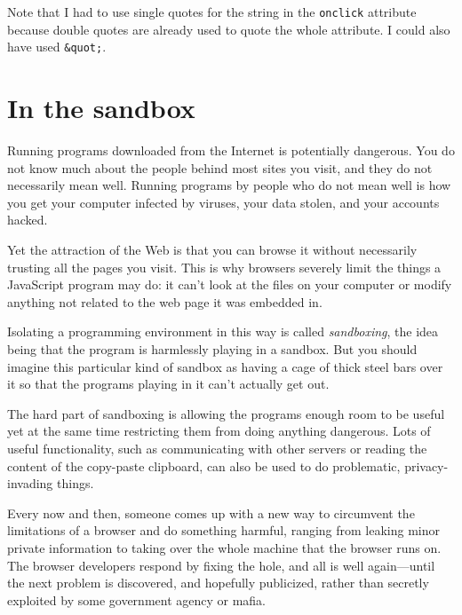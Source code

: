 Note that I had to use single quotes for the string in the \lstinline`onclick` attribute because double quotes are already used to quote the whole attribute. I could also have used \lstinline`&quot;`.

\section{In the sandbox}

Running programs downloaded from the Internet is potentially dangerous. You do not know much about the people behind most sites you visit, and they do not necessarily mean well. Running programs by people who do not mean well is how you get your computer infected by viruses, your data stolen, and your accounts hacked.

Yet the attraction of the Web is that you can browse it without necessarily trusting all the pages you visit. This is why browsers severely limit the things a JavaScript program may do: it can't look at the files on your computer or modify anything not related to the web page it was embedded in.

Isolating a programming environment in this way is called \emph{sandboxing}, the idea being that the program is harmlessly playing in a sandbox. But you should imagine this particular kind of sandbox as having a cage of thick steel bars over it so that the programs playing in it can't actually get out.

The hard part of sandboxing is allowing the programs enough room to be useful yet at the same time restricting them from doing anything dangerous. Lots of useful functionality, such as communicating with other servers or reading the content of the copy-paste clipboard, can also be used to do problematic, privacy-invading things.

Every now and then, someone comes up with a new way to circumvent the limitations of a browser and do something harmful, ranging from leaking minor private information to taking over the whole machine that the browser runs on. The browser developers respond by fixing the hole, and all is well again—until the next problem is discovered, and hopefully publicized, rather than secretly exploited by some government agency or mafia.

